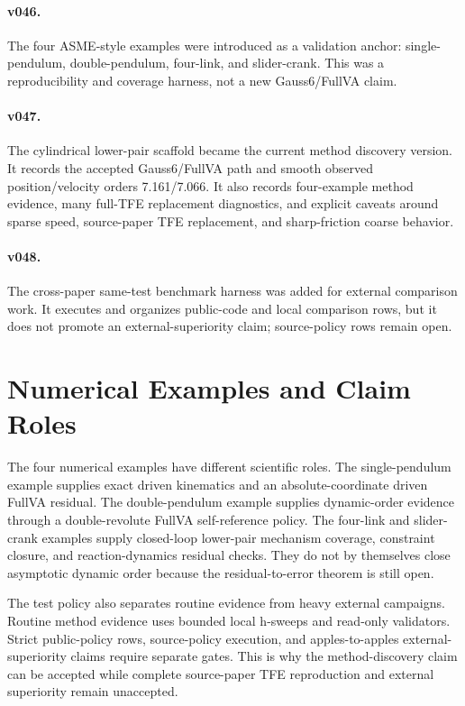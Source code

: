 \documentclass[10pt]{article}
\newcommand{\method}{Gauss6/\allowbreak FullVA}
\begin{document}
\paragraph{v046.}
The four ASME-style examples were introduced as a validation anchor:
single-pendulum, double-pendulum, four-link, and slider-crank. This was a
reproducibility and coverage harness, not a new \method{} claim.

\paragraph{v047.}
The cylindrical lower-pair scaffold became the current method discovery
version. It records the accepted \method{} path and smooth observed
position/velocity orders 7.161/7.066. It also records four-example method
evidence, many full-TFE replacement diagnostics, and explicit caveats around
sparse speed, source-paper TFE replacement, and sharp-friction coarse behavior.

\paragraph{v048.}
The cross-paper same-test benchmark harness was added for external comparison
work. It executes and organizes public-code and local comparison rows, but it
does not promote an external-superiority claim; source-policy rows remain open.

\section{Numerical Examples and Claim Roles}

The four numerical examples have different scientific roles. The
single-pendulum example supplies exact driven kinematics and an
absolute-coordinate driven FullVA residual. The double-pendulum example
supplies dynamic-order evidence through a double-revolute FullVA
self-reference policy. The four-link and slider-crank examples supply
closed-loop lower-pair mechanism coverage, constraint closure, and
reaction-dynamics residual checks. They do not by themselves close asymptotic
dynamic order because the residual-to-error theorem is still open.

The test policy also separates routine evidence from heavy external campaigns.
Routine method evidence uses bounded local h-sweeps and read-only validators.
Strict public-policy rows, source-policy execution, and apples-to-apples
external-superiority claims require separate gates. This is why the
method-discovery claim can be accepted while complete source-paper TFE
reproduction and external superiority remain unaccepted.
\end{document}
